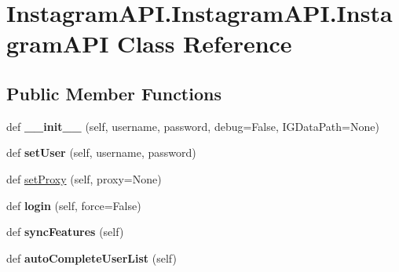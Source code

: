\hypertarget{class_instagram_a_p_i_1_1_instagram_a_p_i_1_1_instagram_a_p_i}{}\section{Instagram\+A\+P\+I.\+Instagram\+A\+P\+I.\+Instagram\+A\+PI Class Reference}
\label{class_instagram_a_p_i_1_1_instagram_a_p_i_1_1_instagram_a_p_i}
\subsection*{Public Member Functions}
\begin{DoxyCompactItemize}
\item 
\mbox{\label{class_instagram_a_p_i_1_1_instagram_a_p_i_1_1_instagram_a_p_i_a60ce10a9e12ab2dbb722fbf18dc5c2e6}} 
def {\bfseries \+\_\+\+\_\+init\+\_\+\+\_\+} (self, username, password, debug=False, I\+G\+Data\+Path=None)
\item 
\mbox{\label{class_instagram_a_p_i_1_1_instagram_a_p_i_1_1_instagram_a_p_i_aa5a53fdd1e0307e04260b29932da2eb3}} 
def {\bfseries set\+User} (self, username, password)
\item 
def \mbox{\hyperlink{class_instagram_a_p_i_1_1_instagram_a_p_i_1_1_instagram_a_p_i_a0dba831021f4b752ae2216209a68521e}{set\+Proxy}} (self, proxy=None)
\item 
\mbox{\label{class_instagram_a_p_i_1_1_instagram_a_p_i_1_1_instagram_a_p_i_aead61ad0afd7821e5b7e48fa487917ee}} 
def {\bfseries login} (self, force=False)
\item 
\mbox{\label{class_instagram_a_p_i_1_1_instagram_a_p_i_1_1_instagram_a_p_i_a522f72b909e16db057a58f17d3aa82fc}} 
def {\bfseries sync\+Features} (self)
\item 
\mbox{\label{class_instagram_a_p_i_1_1_instagram_a_p_i_1_1_instagram_a_p_i_af080d908628687c2ed53e20fe20ea68b}} 
def {\bfseries auto\+Complete\+User\+List} (self)

\end{DoxyCompactItemize}
